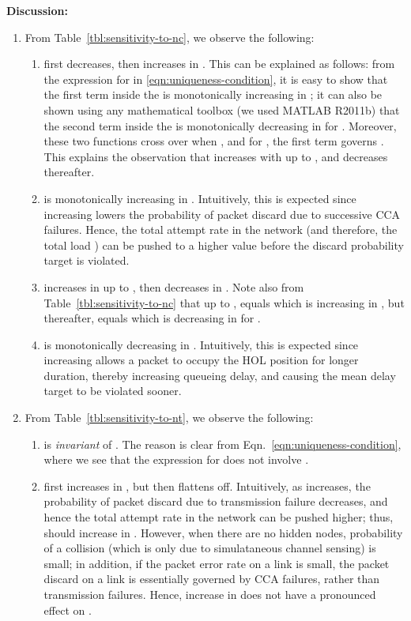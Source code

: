 \documentclass[12pt, draftclsnofoot, onecolumn]{IEEEtran}
\newcommand{\gap}{\vspace{2mm}}
\begin{document}
\gap
\noindent
\textbf{Discussion:}

\begin{enumerate}
\item From Table~\ref{tbl:sensitivity-to-nc}, we observe the following:
\begin{enumerate}
\item  first decreases, then increases in . This can be explained as follows: from the expression for  in \eqref{eqn:uniqueness-condition}, it is easy to show that the first term inside the  is monotonically increasing in ; it can also be shown using any mathematical toolbox (we used MATLAB R2011b) that the second term inside the  is monotonically decreasing in  for . Moreover, these two functions cross over when , and for , the first term governs . This explains the observation that  increases with  up to , and decreases thereafter.  
\item  is monotonically increasing in . Intuitively, this is expected since increasing  lowers the probability of packet discard due to successive CCA failures. Hence, the total attempt rate in the network (and therefore, the total load ) can be pushed to a higher value before the discard probability target is violated.
\item  increases in  up to , then decreases in . Note also from Table~\ref{tbl:sensitivity-to-nc} that up to ,  equals  which is increasing in , but thereafter,  equals  which is decreasing in  for .
\item  is monotonically decreasing in . Intuitively, this is expected since increasing  allows a packet to occupy the HOL position for longer duration, thereby increasing queueing delay, and causing the mean delay target to be violated sooner. 
\end{enumerate}
\item From Table~\ref{tbl:sensitivity-to-nt}, we observe the following:
\begin{enumerate}
\item  is \emph{invariant} of . The reason is clear from Eqn.~\ref{eqn:uniqueness-condition}, where we see that the expression for  does not involve .
\item  first increases in , but then flattens off. Intuitively, as  increases, the probability of packet discard due to transmission failure decreases, and hence the total attempt rate in the network can be pushed higher; thus,  should increase in . However, when there are no hidden nodes, probability of a collision (which is only due to simulataneous channel sensing) is small; in addition, if the packet error rate on a link is small, the packet discard on a link is essentially governed by CCA failures, rather than transmission failures. Hence, increase in  does not have a pronounced effect on .

\end{enumerate}
\end{enumerate}
\end{document}
